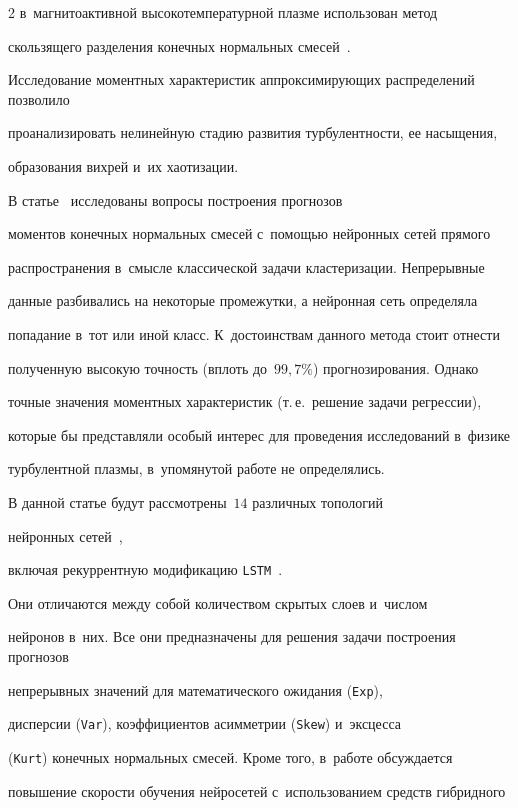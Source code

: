 \begin{multicols}{2}
в~маг\-ни\-то\-ак\-тив\-ной высокотемпературной плазме использован метод 

скользящего разделения конечных нормальных смесей~\cite{Korolev2011}. 

Исследование моментных характеристик аппроксимирующих распределений позволило 

проанализировать нелинейную стадию развития тур\-бу\-лент\-ности, ее насыщения, 

образования вихрей и~их хаотизации.



В статье~\cite{Gorshenin2019b} исследованы вопросы построения прогнозов 

моментов конечных нормальных смесей с~помощью нейронных сетей прямого 

распространения в~смысле классической задачи кластеризации. Непрерывные 

данные разбивались на некоторые промежутки, а нейронная сеть определяла 

попадание в~тот или иной класс. К~достоинствам данного метода стоит отнести 

полученную высокую точность (вплоть до~$99{,}7\%$) прогнозирования. Однако

 точные значения моментных характеристик (т.\,е.\ решение задачи регрессии), 

 которые бы представляли особый интерес для проведения исследований в~физике 

 турбулентной плазмы, в~упомянутой работе не определялись.



В данной статье будут рассмотрены~$14$ различных топологий

нейронных сетей~\cite{Buduma2017}, 

включая рекуррентную модификацию \verb"LSTM"~\cite{Greff2017}.

Они отличаются между собой количеством скрытых слоев и~числом 

нейронов в~них. Все они предназначены для решения задачи построения прогнозов 

непрерывных значений для математического ожидания (\verb"Exp"), 

дисперсии (\verb"Var"), коэффициентов асим\-мет\-рии (\verb"Skew") и~эксцесса 

(\verb"Kurt") конечных нормальных смесей. Кроме того, в~работе обсуждается 

повышение скорости обучения нейросетей с~использованием средств гибридного 


\end{multicols}
